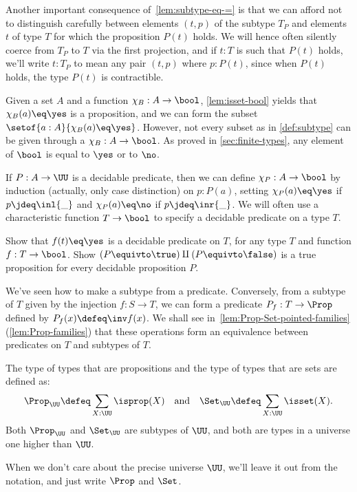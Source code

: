 \begin{remark}\label{rem:subtype-convention}
  Another important consequence of~\cref{lem:subtype-eq-=}
  is that we can afford not to distinguish carefully
  between elements $(t,p)$ of the subtype $T_P$
  and elements $t$ of type $T$ for which the proposition $P(t)$ holds.
  We will hence often silently coerce from $T_P$ to $T$ via the first projection,
  and if $t:T$ is such that $P(t)$ holds, we'll write $t:T_P$
  to mean any pair $(t,p)$ where $p:P(t)$,
  since when $P(t)$ holds, the type $P(t)$ is contractible.
\end{remark}
Given a set $A$ and a function $\chi_B: A\to\bool$,
\cref{lem:isset-bool} yields that $\chi_B(a) \eq \yes$ is a
proposition, and we can form
the subset $\setof{a:A}{\chi_B(a) \eq \yes}$. However,
not every subset as in \cref{def:subtype} can be given
through a $\chi_B: A\to\bool$. As proved in \cref{sec:finite-types},
any element of $\bool$ is equal to $\yes$ or to $\no$.

If $P: A\to\UU$ is a decidable predicate, then
we can define $\chi_P: A\to\bool$ by induction (actually,
only case distinction) on $p:P(a)$, setting $\chi_P(a) \eq \yes$
if $p\jdeq\inl{\_}$ and $\chi_P(a) \eq \no$ if $p\jdeq\inr{\_}$.
We will often use a characteristic function $T\to\bool$ to
specify a decidable predicate on a type $T$.

\begin{xca}\label{xca:decidability}
Show that $f(t) \eq \yes$ is a decidable predicate on $T$,
for any type $T$ and function $f:T\to\bool$.
Show $(P\equivto\true)\amalg(P\equivto\false)$ is a true proposition
for every decidable proposition $P$.
\end{xca}
We've seen how to make a subtype from a predicate.
Conversely, from a subtype of $T$ given by the injection
$f : S \to T$, we can form a predicate $P_f : T \to \Prop$
defined by $P_f(x) \defeq \inv f(x)$.
We shall see in~\cref{lem:Prop-Set-pointed-families}
(\ref{lem:Prop-families}) that these operations form an equivalence
between predicates on $T$ and subtypes of $T$.

\begin{definition}\label{def:Prop-Set}
The type of types that are propositions and the
type of types that are sets are defined as:
\[\Prop_\UU\defeq \sum_{X:\UU}\isprop(X)\quad
\text{and}\quad\Set_\UU\defeq \sum_{X:\UU}\isset(X).\]
Both $\Prop_\UU$ and $\Set_\UU$ are subtypes of $\UU$, and
both are types in a universe one higher than $\UU$.
\end{definition}
When we don't care about the precise universe $\UU$,
we'll leave it out from the notation,
and just write $\Prop$ and $\Set$.

